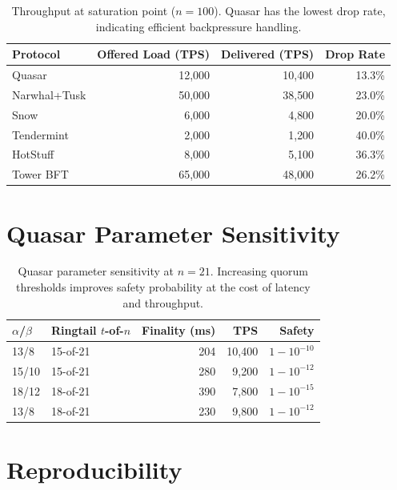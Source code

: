 \documentclass[11pt]{article}
\begin{document}
\begin{table}[h]
\centering
\begin{tabular}{@{}lrrr@{}}
\toprule
\textbf{Protocol} & \textbf{Offered Load (TPS)} & \textbf{Delivered (TPS)} & \textbf{Drop Rate} \\
\midrule
Quasar        & 12{,}000 & 10{,}400 & 13.3\% \\
Narwhal+Tusk  & 50{,}000 & 38{,}500 & 23.0\% \\
Snow          & 6{,}000  & 4{,}800  & 20.0\% \\
Tendermint    & 2{,}000  & 1{,}200  & 40.0\% \\
HotStuff      & 8{,}000  & 5{,}100  & 36.3\% \\
Tower BFT     & 65{,}000 & 48{,}000 & 26.2\% \\
\bottomrule
\end{tabular}
\caption{Throughput at saturation point ($n=100$). Quasar has the lowest drop rate,
indicating efficient backpressure handling.}
\label{tab:saturation}
\end{table}

\section{Quasar Parameter Sensitivity}
\label{app:params}

\begin{table}[h]
\centering
\begin{tabular}{@{}llrrr@{}}
\toprule
\textbf{$\alpha$/$\beta$} & \textbf{Ringtail $t$-of-$n$} & \textbf{Finality (ms)} & \textbf{TPS} & \textbf{Safety} \\
\midrule
13/8   & 15-of-21 & 204   & 10{,}400 & $1 - 10^{-10}$ \\
15/10  & 15-of-21 & 280   & 9{,}200  & $1 - 10^{-12}$ \\
18/12  & 18-of-21 & 390   & 7{,}800  & $1 - 10^{-15}$ \\
13/8   & 18-of-21 & 230   & 9{,}800  & $1 - 10^{-12}$ \\
\bottomrule
\end{tabular}
\caption{Quasar parameter sensitivity at $n=21$. Increasing quorum thresholds
improves safety probability at the cost of latency and throughput.}
\label{tab:params}
\end{table}

\section{Reproducibility}
\label{app:reproduce}
\end{document}
